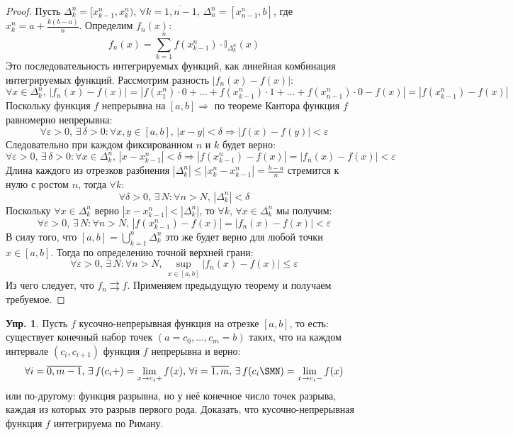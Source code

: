 \documentclass[12pt]{article}
\newcommand{\VE}{\varepsilon}
\theoremstyle{definition}
\newtheorem{exrc}{Упр.}
\begin{document}
\begin{proof}
	Пусть $\Delta_k^n = [x_{k-1}^n, x_k^n), \, \forall k = \overline{1,n-1}, \, \Delta_n^n = [x_{n-1}^n,b]$, где $x_k^n = a + \tfrac{k(b-a)}{n}$. Определим  $f_n(x)$:
	$$
		f_n(x) = \displaystyle \sum\limits_{k = 1}^n f(x_{k-1}^n){\cdot}\mathbb{I}_{\Delta_k^n}(x)
	$$
	Это последовательность интегрируемых функций, как линейная комбинация интегрируемых функций. Рассмотрим разность $|f_n(x) - f(x)|$:
	$$
		\forall x \in \Delta_k^n, \, |f_n(x) - f(x)| = |f(x_1^n){\cdot}0 + \dotsc + f(x_{k-1}^n){\cdot}1 + \dotsc + f(x_{n-1}^n){\cdot}0 - f(x)| = |f(x_{k-1}^n) - f(x)|
	$$
	Поскольку функция $f$ непрерывна на $[a,b] \Rightarrow$ по теореме Кантора функция $f$ равномерно непрерывна:
	$$
		\forall \VE > 0, \, \exists \, \delta > 0 \colon \forall x,y \in [a,b],\, |x - y| < \delta \Rightarrow |f(x) - f(y)| < \VE 
	$$
	Следовательно при каждом фиксированном $n$ и $k$ будет верно:
	$$
		\forall \VE > 0, \, \exists \, \delta > 0 \colon \forall x \in \Delta_k^n, \, |x - x_{k-1}^n| < \delta \Rightarrow |f(x_{k-1}^n) - f(x)| = |f_n(x) - f(x)| < \VE
	$$
	Длина каждого из отрезков разбиения $|\Delta_k^n| \leq |x_k^n - x_{k-1}^n| = \tfrac{b-a}{n}$ стремится к нулю с ростом $n$, тогда $\forall k$:
	$$
		\forall \delta > 0, \, \exists \, N \colon \forall n > N, \, |\Delta_k^n| < \delta
	$$
	Поскольку $\forall x \in \Delta_k^n$ верно $|x - x_{k-1}^n| < |\Delta_k^n|$, то $\forall k, \, \forall x \in \Delta_k^n$ мы получим:
	$$
		\forall \VE > 0, \, \exists \, N \colon \forall n > N, \, |f(x_{k-1}^n) - f(x)|  = |f_n(x) - f(x)| < \VE
	$$
	В силу того, что $[a,b] = \bigcup\limits_{k=1}^n\Delta_k^n$ это же будет верно для любой точки $x \in [a,b]$. Тогда по определению точной верхней грани:
	$$
		\forall \VE > 0, \, \exists \, N \colon \forall n > N, \, \sup\limits_{x \in [a,b]}|f_n(x) - f(x)| \leq \VE 
	$$
	Из чего следует, что $f_n \rightrightarrows f$. Применяем предыдущую теорему и получаем требуемое.
\end{proof}
\begin{exrc}
	Пусть $f$ кусочно-непрерывная функция на отрезке $[a,b]$, то есть: существует конечный набор точек $(a = c_0,\dotsc, c_m = b)$ таких, что на каждом интервале $(c_i, c_{i+1})$ функция $f$ непрерывна и верно:
	$$
		\forall i = \overline{0,m-1}, \, \exists \, f(c_i+) = \lim\limits_{x \to c_i +}f(x), \, \forall i = \overline{1, m}, \, \exists \, f(c_i \SMN) = \lim\limits_{x \to c_i -}f(x)
	$$ 
	или по-другому: функция разрывна, но у неё конечное число точек разрыва, каждая из которых это разрыв первого рода. Доказать, что кусочно-непрерывная функция $f$ интегрируема по Риману.
\end{exrc}
\end{document}
